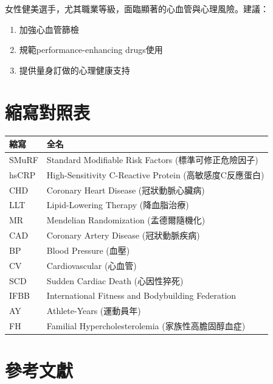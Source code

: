 \documentclass[12pt,a4paper]{article}
\begin{document}
\begin{tcolorbox}[colback=emergency_blue!5!white,colframe=emergency_blue,title=\textbf{臨床建議}]
女性健美選手，尤其職業等級，面臨顯著的心血管與心理風險。建議：
\begin{enumerate}
    \item 加強心血管篩檢
    \item 規範performance-enhancing drugs使用
    \item 提供量身訂做的心理健康支持
\end{enumerate}
\end{tcolorbox}

\section{縮寫對照表}

\begin{longtable}{p{4cm}p{10cm}}
\toprule
\textbf{縮寫} & \textbf{全名} \\
\midrule
\endfirsthead
\bottomrule
\endfoot

SMuRF & Standard Modifiable Risk Factors (標準可修正危險因子) \\
hsCRP & High-Sensitivity C-Reactive Protein (高敏感度C反應蛋白) \\
CHD & Coronary Heart Disease (冠狀動脈心臟病) \\
LLT & Lipid-Lowering Therapy (降血脂治療) \\
MR & Mendelian Randomization (孟德爾隨機化) \\
CAD & Coronary Artery Disease (冠狀動脈疾病) \\
BP & Blood Pressure (血壓) \\
CV & Cardiovascular (心血管) \\
SCD & Sudden Cardiac Death (心因性猝死) \\
IFBB & International Fitness and Bodybuilding Federation \\
AY & Athlete-Years (運動員年) \\
FH & Familial Hypercholesterolemia (家族性高膽固醇血症) \\
\bottomrule
\end{longtable}

\section{參考文獻}
\end{document}
